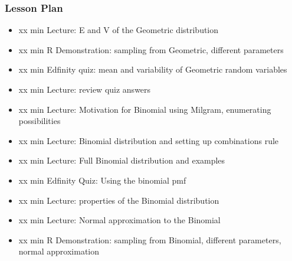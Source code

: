 \begin{frame}
    \frametitle{Lesson Plan}
    \begin{itemize}
        \item xx min Lecture: E and V of the Geometric distribution
        \item xx min R Demonstration: sampling from Geometric, different parameters
        \item xx min Edfinity quiz: mean and variability of Geometric random variables
        \item xx min Lecture: review quiz answers

        \item xx min Lecture: Motivation for Binomial using Milgram, enumerating possibilities
        \item xx min Lecture: Binomial distribution and setting up combinations rule
        \item xx min Lecture: Full Binomial distribution and examples
        \item xx min Edfinity Quiz: Using the binomial pmf
        \item xx min Lecture: properties of the Binomial distribution
        \item xx min Lecture: Normal approximation to the Binomial
        \item xx min R Demonstration: sampling from Binomial, different parameters, normal approximation
    \end{itemize}
\end{frame}



